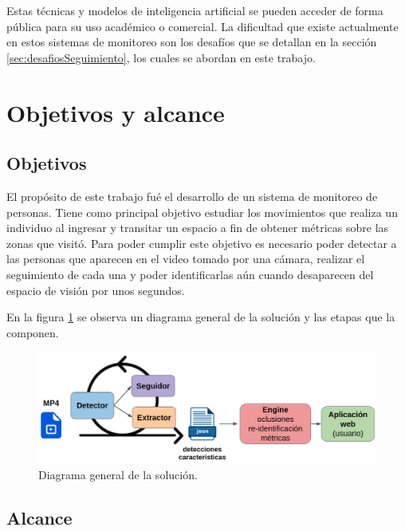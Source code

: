 Estas técnicas y modelos de inteligencia artificial se pueden acceder de forma pública para su uso académico o comercial. La dificultad que existe actualmente en estos sistemas de monitoreo son los desafíos que se detallan en la sección \ref{sec:desafiosSeguimiento}, los cuales se abordan en este trabajo.


\section{Objetivos y alcance}
\label{sec:objetivosAlcance}

\subsection{Objetivos}

El propósito de este trabajo fué el desarrollo de un sistema de monitoreo de personas. Tiene como principal objetivo estudiar los movimientos que realiza un individuo al ingresar y transitar un espacio a fin de obtener métricas sobre las zonas que visitó. Para poder cumplir este objetivo es necesario poder detectar a las personas que aparecen en el video tomado por una cámara, realizar el seguimiento de cada una y poder identificarlas aún cuando desaparecen del espacio de visión por unos segundos.

En la figura \ref{fig:esquemaGeneral} se observa un diagrama general de la solución y las etapas que la componen.

\begin{figure}[ht]
	\centering
	\includegraphics[scale=.6]{./Figures/esquemaGeneral.png}
	\caption{Diagrama general de la solución.}
	\label{fig:esquemaGeneral}
\end{figure}

\newpage

\subsection{Alcance}

